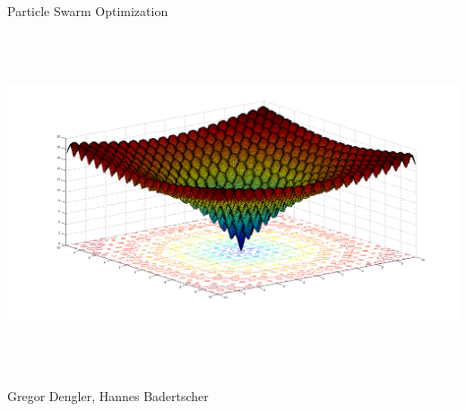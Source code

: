 
\begin{titlepage}
	\vspace{2cm}
	\begin{center}
	{	\huge
		Particle Swarm Optimization
	}
	\end{center}
	
		
	\vspace{4cm}
	\includegraphics[height=10cm]{images/title.png}
	\vspace{4cm}
	
	\begin{center}
		\large
		Gregor Dengler, Hannes Badertscher \\
		\vspace{5mm}
		\Date
	\end{center}
	
	\thispagestyle{empty} %
\end{titlepage}

\tableofcontents\newpage
